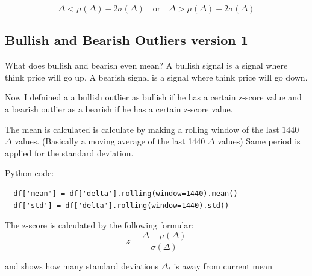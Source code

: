 \documentclass[12pt]{article}
\begin{document}
\begin{equation}\label{eq: outlier_detection}
  \Delta < \mu(\Delta) - 2\sigma(\Delta) \quad \text{or} \quad \Delta > \mu(\Delta) + 2\sigma(\Delta)    
\end{equation}

\subsection{Bullish and Bearish Outliers version 1}
What does bullish and bearish even mean? A bullish signal is a signal where think price will go up. A bearish signal is a signal where think price will go down.

Now I defnined a a bullish outlier as bullish if he has a certain z-score value and a bearish outlier as a bearish if he has a certain z-score value.

The mean is calculated is calculate by making a rolling window of the last $1440$ $\Delta$ values. (Basically a moving average of the last 1440 $\Delta$ values)
Same period is applied for the standard deviation.

Python code:
\begin{verbatim}
  df['mean'] = df['delta'].rolling(window=1440).mean()
  df['std'] = df['delta'].rolling(window=1440).std()
\end{verbatim}





The z-score is calculated by the following formular:
\begin{equation}
  z = \frac{\Delta - \mu(\Delta)}{\sigma(\Delta)}
\end{equation}

and shows how many standard deviations $\Delta_t$ is away from current mean	  







\end{document}
